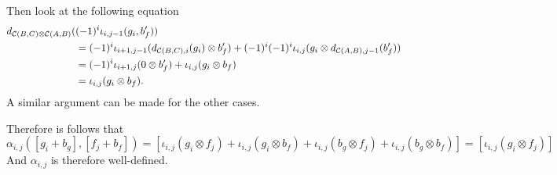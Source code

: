 \begin{remark}
\begin{enumerate}
{            Then look at the following equation
            \begin{align*}
                d_{{\mathcal{C}}(B, C) \otimes {\mathcal{C}}(A, B)}(&(-1)^i \iota_{i, j - 1}(g_i, b_f')) \\
                &= (-1)^i \iota_{i + 1, j - 1}(d_{{\mathcal{C}}(B, C), i}(g_i) \otimes b_f') + (-1)^i(-1)^i\iota_{i, j}(g_i \otimes d_{{\mathcal{C}}(A, B), j - 1}(b_f')) \\
                &= (-1)^i \iota_{i + 1, j}(0 \otimes b_f') + \iota_{i, j}(g_i \otimes b_f) \\
                &= \iota_{i, j}(g_i \otimes b_f).
            \end{align*}
            A similar argument can be made for the other cases.

            Therefore is follows that
            \[
                \alpha_{i, j}([g_i + b_g], [f_j + b_f]) = [\iota_{i, j}(g_i \otimes f_j) + \iota_{i, j}(g_i \otimes b_f) + \iota_{i, j}(b_g \otimes f_j) + \iota_ {i, j}(b_g \otimes b_f)] = [\iota_{i, j}(g_i \otimes f_j)]
            \]
            And \( \alpha_{i, j} \) is therefore well-defined.
        }
    \end{enumerate}
\end{remark}

